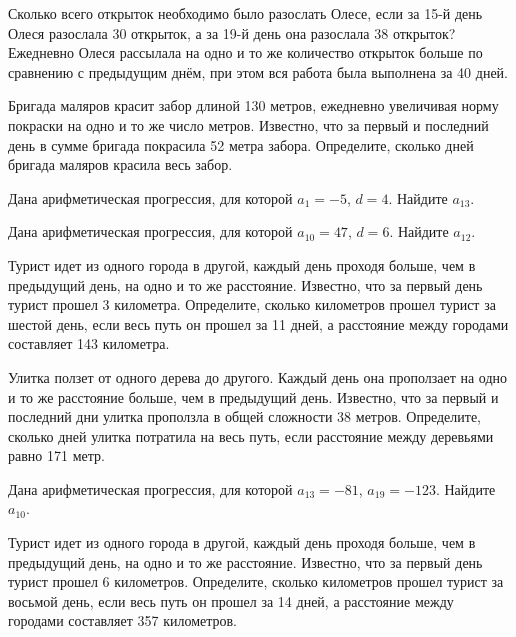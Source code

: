 \documentclass[4apaper]{article}
\begin{document}
\begin{taskBN}{78}
Сколько всего открыток необходимо было разослать Олесе, если за 15-й день Олеся разослала 30 открыток, а за 19-й день она разослала 38 открыток? Ежедневно Олеся рассылала на одно и то же количество открыток больше по сравнению с предыдущим днём, при этом вся работа была выполнена за 40 дней. 
\end{taskBN}

\begin{taskBN}{79}
 Бригада маляров красит забор длиной 130 метров, ежедневно увеличивая норму покраски на одно и то же число метров. Известно, что за первый и последний день в сумме бригада покрасила 52 метра забора.  Определите, сколько дней бригада маляров красила весь забор. 
\end{taskBN}

\begin{taskBN}{80}
Дана арифметическая прогрессия, для которой $a_1 = -5$, $d=4$. Найдите $a_{13}$.
\end{taskBN}

\begin{taskBN}{81}
Дана арифметическая прогрессия, для которой $a_{10} = 47$, $d=6$. Найдите $a_{12}$.
\end{taskBN}

\begin{taskBN}{82}
Турист идет из одного города в другой, каждый день проходя больше, чем в предыдущий день, на одно и то же расстояние. Известно, что за первый день турист прошел 3 километра. Определите, сколько километров прошел турист за шестой день, если весь путь он прошел за 11 дней, а расстояние между городами составляет 143 километра.
\end{taskBN}

\begin{taskBN}{83}
 Улитка ползет от одного дерева до другого. Каждый день она проползает на одно и то же расстояние больше, чем в предыдущий день. Известно, что за первый и последний дни улитка проползла в общей сложности 38 метров. Определите, сколько дней улитка потратила на весь путь, если расстояние между деревьями равно 171 метр.
\end{taskBN}

\begin{taskBN}{84}
Дана арифметическая прогрессия, для которой $a_{13} = -81$, $a_{19} = -123$. Найдите $a_{10}$.
\end{taskBN}

\begin{taskBN}{85}
Турист идет из одного города в другой, каждый день проходя больше, чем в предыдущий день, на одно и то же расстояние. Известно, что за первый день турист прошел 6 километров. Определите, сколько километров прошел турист за восьмой день, если весь путь он прошел за 14 дней, а расстояние между городами составляет 357 километров.
\end{taskBN}
\end{document}
